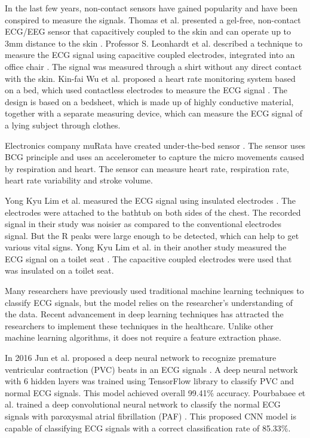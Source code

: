 In the last few years, non-contact sensors have gained popularity and have been conspired to measure the signals. Thomas et al. presented a gel-free, non-contact ECG/EEG sensor that capacitively coupled to the skin and can operate up to 3mm distance to the skin \cite{sullivan2007low}. Professor S. Leonhardt et al. described a technique to measure the ECG signal using capacitive coupled electrodes, integrated into an office chair \cite{aleksandrowicz2007wireless}. The signal was measured through a shirt without any direct contact with the skin. Kin-fai Wu et al. proposed a heart rate monitoring system based on a bed, which used contactless electrodes to measure the ECG signal \cite{wu2008contactless}. The design is based on a bedsheet, which is made up of highly conductive material, together with a separate measuring device, which can measure the ECG signal of a lying subject through clothes. 

Electronics company muRata have created under-the-bed sensor  \cite{muratabcg bed}. The sensor uses BCG principle and uses an accelerometer to capture the micro movements caused by respiration and heart. The sensor can measure heart rate, respiration rate, heart rate variability and stroke volume.

Yong Kyu Lim et al. measured the ECG signal using insulated electrodes \cite{lim2004ecg}. The electrodes were attached to the bathtub on both sides of the chest. The recorded signal in their study was noisier as compared to the conventional electrodes signal. But the R peaks were large enough to be detected, which can help to get various vital signs. Yong Kyu Lim et al. in their another study measured the ECG signal on a toilet seat \cite{kim2004electrically}. The capacitive coupled electrodes were used that was insulated on a toilet seat.

Many researchers have previously used traditional machine learning techniques to classify ECG signals, but the model relies on the researcher's understanding of the data. Recent advancement in deep learning techniques has attracted the researchers to implement these techniques in the healthcare. Unlike other machine learning algorithms, it does not require a feature extraction phase.

In 2016 Jun et al. proposed a deep neural network to recognize premature ventricular contraction (PVC) beats in an ECG signals \cite{7838258} . A deep neural network with 6 hidden layers was trained using TensorFlow library to classify PVC and normal ECG signals. This model achieved overall 99.41\% accuracy. Pourbabaee et al. trained a deep convolutional neural network to classify the normal ECG signals with paroxysmal atrial fibrillation (PAF) \cite{7727866}. This proposed CNN model is capable of
classifying ECG signals with a correct classification rate of 85.33\%.

